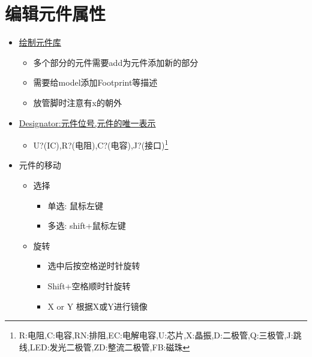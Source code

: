 \documentclass[11pt]{article}
\begin{document}
\section{编辑元件属性}
\label{sec:org4a8bc29}
\begin{itemize}
\item \uline{绘制元件库}
\begin{itemize}
\item 多个部分的元件需要add为元件添加新的部分
\item 需要给model添加Footprint等描述
\item 放管脚时注意有x的朝外
\end{itemize}
\item \uline{Designator:元件位号,元件的唯一表示}
\begin{itemize}
\item U?(IC),R?(电阻),C?(电容),J?(接口)\footnote{R:电阻,C:电容,RN:排阻,EC:电解电容,U:芯片,X:晶振,D:二极管,Q:三极管,J:跳线,LED:发光二极管,ZD:整流二极管,FB:磁珠}
\end{itemize}
\item 元件的移动
\begin{itemize}
\item 选择
\begin{itemize}
\item 单选: 鼠标左键
\item 多选: shift+鼠标左键
\end{itemize}
\item 旋转
\begin{itemize}
\item 选中后按空格逆时针旋转
\item Shift+空格顺时针旋转
\item X or Y 根据X或Y进行镜像
\end{itemize}
\end{itemize}
\end{itemize}
\end{document}
